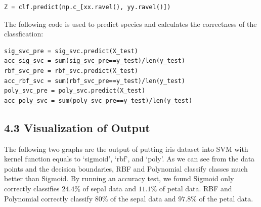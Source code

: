 \documentclass[12pt]{article}
\begin{document}
\begin{lstlisting}[language=Python, caption=Prediction]
Z = clf.predict(np.c_[xx.ravel(), yy.ravel()])
\end{lstlisting}
The following code is used to predict species and calculates the correctness of the classfication: 
\begin{lstlisting}
sig_svc_pre = sig_svc.predict(X_test)
acc_sig_svc = sum(sig_svc_pre==y_test)/len(y_test)
rbf_svc_pre = rbf_svc.predict(X_test)
acc_rbf_svc = sum(rbf_svc_pre==y_test)/len(y_test)
poly_svc_pre = poly_svc.predict(X_test)
acc_poly_svc = sum(poly_svc_pre==y_test)/len(y_test)
\end{lstlisting}

\subsection*{4.3 Visualization of Output}
The following two graphs are the output of putting iris dataset into SVM with kernel function equals to `sigmoid', `rbf', and `poly'. As we can see from the data points and the decision boundaries, RBF and Polynomial classify classes much better than Sigmoid. By running an accuracy test, we found Sigmoid only correctly classifies $24.4\%$ of sepal data and $11.1\%$ of petal data.
RBF and Polynomial correctly classify $80\%$ of the sepal data and $97.8\%$ of the petal data. 
\end{document}
